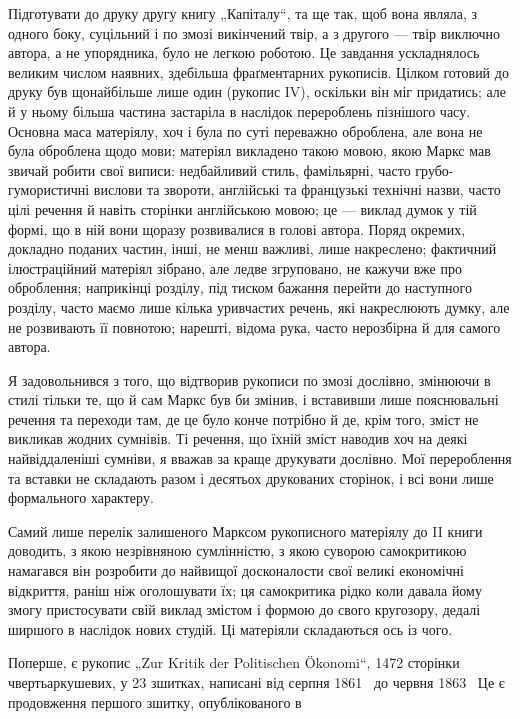 
Підготувати до друку другу книгу „Капіталу“, та ще так, щоб вона
являла, з одного боку, суцільний і по змозі викінчений твір, а з другого
— твір виключно автора, а не упорядника, було не легкою роботою.
Це завдання ускладнялось великим числом наявних, здебільша фраґментарних
рукописів. Цілком готовий до друку був щонайбільше лише один
(рукопис IV), оскільки він міг придатись; але й у ньому більша частина
застаріла в наслідок перероблень пізнішого часу. Основна маса матеріялу,
хоч і була по суті переважно оброблена, але вона не була оброблена щодо
мови; матеріял викладено такою мовою, якою Маркс мав звичай робити свої
виписи: недбайливий стиль, фамільярні, часто грубо-гумористичні вислови
та звороти, англійські та французькі технічні назви, часто цілі речення
й навіть сторінки англійською мовою; це — виклад думок у тій формі,
що в ній вони щоразу розвивалися в голові автора. Поряд окремих,
докладно поданих частин, інші, не менш важливі, лише накреслено; фактичний
ілюстраційний матеріял зібрано, але ледве згруповано, не кажучи
вже про оброблення; наприкінці розділу, під тиском бажання перейти до
наступного розділу, часто маємо лише кілька уривчастих речень, які накреслюють
думку, але не розвивають її повнотою; нарешті, відома рука,
часто нерозбірна й для самого автора.

Я задовольнився з того, що відтворив рукописи по змозі дослівно,
змінюючи в стилі тільки те, що й сам Маркс був би змінив, і вставивши
лише пояснювальні речення та переходи там, де це було конче потрібно
й де, крім того, зміст не викликав жодних сумнівів. Ті речення, що їхній
зміст наводив хоч на деякі найвіддаленіші сумніви, я вважав за краще
друкувати дослівно. Мої перероблення та вставки не складають разом і
десятьох друкованих сторінок, і всі вони лише формального характеру.

Самий лише перелік залишеного Марксом рукописного матеріялу до
II книги доводить, з якою незрівняною сумлінністю, з якою суворою
самокритикою намагався він розробити до найвищої досконалости свої
великі економічні відкриття, раніш ніж оголошувати їх; ця самокритика
рідко коли давала йому змогу пристосувати свій виклад змістом і формою
до свого кругозору, дедалі ширшого в наслідок нових студій. Ці
матеріяли складаються ось із чого.

Поперше, є рукопис „Zur Kritik der Politischen Ökonomi“, 1472 сторінки
чвертьаркушевих, у 23 зшитках, написані від серпня 1861~ до
червня 1863~ Це є продовження першого зшитку, опублікованого в
\parbreak{}  %
